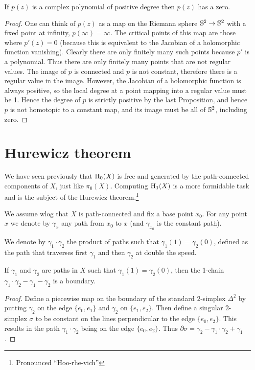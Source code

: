 \begin{cor}
    If $p(z)$ is a complex polynomial of positive degree then $p(z)$ has a zero.
\end{cor}
\begin{proof}
     One can think of $p(z)$ as a map on the Riemann sphere $\mathbb{S}^2\to \mathbb{S}^2$ with a fixed point at infinity, $p(\infty)=\infty$. The critical points of this map are those where $p'(z)=0$ (because this is equivalent to the Jacobian of a holomorphic function vanishing). Clearly there are only finitely many such points because $p'$ is a polynomial. Thus there are only finitely many points that are not regular values. The image of $p$ is connected and $p$ is not constant, therefore there is a regular value in the image. However, the Jacobian of a holomorphic function is always positive, so the local degree at a point mapping into a regular value must be 1. Hence the degree of $p$ is strictly positive by the last Proposition, and hence $p$ is not homotopic to a constant map, and its image must be all of $\mathbb{S}^2$, including zero.
\end{proof}



\section{Hurewicz theorem}

We have seen previously that $\mathrm{H}_0(X)$ is free and generated by the path-connected components of $X$, just like $\pi_0(X)$. Computing $\mathrm{H}_1(X)$ is a more formidable task and is the subject of the Hurewicz theorem.\footnote{Pronounced ``Hoo-rhe-vich''}

We assume \gls{wlog} that $X$ is path-connected and fix a base point $x_0$. For any point $x$ we denote by $\gamma_x$ any path from $x_0$ to $x$ (and $\gamma_{x_0}$ is the constant path).

We denote by $\gamma_1\cdot \gamma_2$ the product of paths such that $\gamma_1(1)=\gamma_2(0)$, defined as the path that traverses first $\gamma_1$ and then $\gamma_2$ at double the speed.

\begin{lem}
    If $\gamma_1$ and $\gamma_2$ are paths in $X$ such that $\gamma_1(1)=\gamma_2(0)$, then the 1-chain $\gamma_1\cdot\gamma_2-\gamma_1-\gamma_2$ is a boundary.
\end{lem}
\begin{proof}
     Define a piecewise map on the boundary of the standard 2-simplex $\Delta^2$ by putting $\gamma_2$ on the edge $\{e_0,e_1\}$ and $\gamma_2$ on $\{e_1,e_2\}$. Then define a singular 2-simplex $\sigma$ to be constant on the lines perpendicular to the edge $\{e_0,e_2\}$. This results in the path $\gamma_1\cdot\gamma_2$ being on the edge $\{e_0,e_2\}$. Thus $\partial\sigma=\gamma_2-\gamma_1\cdot\gamma_2+\gamma_1$.
\end{proof}

